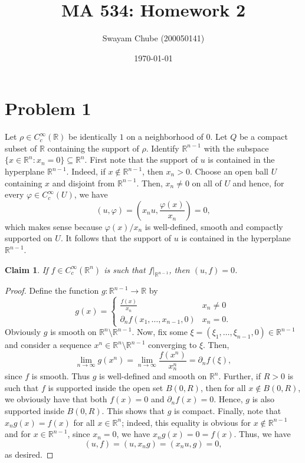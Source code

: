 \documentclass[10pt]{amsart}
\title{MA 534: Homework 2}
\author{Swayam Chube (200050141)}
\date{\today}
\theoremstyle{thmstyle}
\newtheorem*{claim}{Claim}
\theoremstyle{defstyle}
\newcommand{\R}{\mathbb{R}}
\begin{document}
\maketitle 

\section{Problem 1}

Let $\rho\in C_c^\infty(\R)$ be identically $1$ on a neighborhood of $0$. Let $Q$ be a compact subset of $\R$ containing the support of $\rho$. Identify $\R^{n - 1}$ with the subspace $\{x\in\R^n\colon x_n = 0\}\subseteq\R^n$. First note that the support of $u$ is contained in the hyperplane $\R^{n - 1}$. Indeed, if $x\notin\R^{n - 1}$, then $x_n > 0$. Choose an open ball $U$ containing $x$ and disjoint from $\R^{n - 1}$. Then, $x_n\ne 0$ on all of $U$ and hence, for every $\varphi\in C_c^\infty(U)$, we have 
\begin{equation*}
    (u, \varphi) = \left(x_n u, \frac{\varphi(x)}{x_n}\right) = 0,
\end{equation*}
which makes sense because $\varphi(x)/x_n$ is well-defined, smooth and compactly supported on $U$. It follows that the support of $u$ is contained in the hyperplane $\R^{n - 1}$.

\begin{claim}
    If $f\in C_c^\infty(\R^n)$ is such that $f|_{\R^{n - 1}}$, then $(u, f) = 0$.
\end{claim}
\begin{proof}
    Define the function $g:\R^{n - 1}\to\R$ by 
    \begin{equation*}
        g(x) = 
        \begin{cases}
            \frac{f(x)}{x_n} & x_n\ne 0\\
            \partial_n f(x_1,\dots,x_{n - 1}, 0) & x_n = 0.
        \end{cases}
    \end{equation*}
    Obviously $g$ is smooth on $\R^n\setminus \R^{n - 1}$. Now, fix some $\xi = (\xi_1,\dots,\xi_{n - 1}, 0)\in\R^{n - 1}$ and consider a sequence $x^n\in\R^n\setminus\R^{n - 1}$ converging to $\xi$. Then, 
    \begin{equation*}
        \lim_{n\to\infty}g(x^n) = \lim_{n\to\infty} \frac{f(x^n)}{x^n_n} = \partial_n f(\xi),
    \end{equation*}
    since $f$ is smooth. Thus $g$ is well-defined and smooth on $\R^n$. Further, if $R > 0$ is such that $f$ is supported inside the open set $B(0, R)$, then for all $x\notin B(0, R)$, we obviously have that both $f(x) = 0$ and $\partial_n f(x) = 0$. Hence, $g$ is also supported inside $B(0, R)$. This shows that $g$ is compact. Finally, note that $x_ng(x) = f(x)$ for all $x\in\R^n$; indeed, this equality is obvious for $x\notin\R^{n - 1}$ and for $x\in\R^{n - 1}$, since $x_n = 0$, we have $x_ng(x) = 0 = f(x)$. Thus, we have 
    \begin{equation*}
        (u, f) = (u, x_ng) = (x_nu, g) = 0, 
    \end{equation*}
    as desired.
\end{proof}
\end{document}
